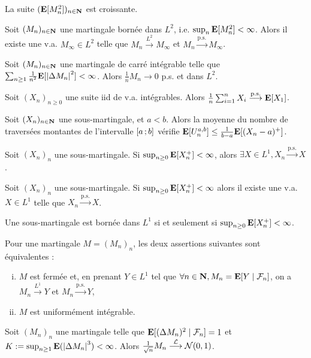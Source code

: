 \begin{rem}
	La suite $(\mathbf{E}[M_n^2])_{n \in \mathbf{N}}$ est croissante.
\end{rem}

\begin{thm}
	Soit $(M_n)_{n \in \mathbf{N}}$ une martingale bornée dans $L^2$, i.e. $\sup_n \mathbf{E}[M_n^2] < \infty$.
	Alors il existe une v.a. $M_\infty \in L^2$ telle que $M_n \overset{L^2}{\longrightarrow} M_\infty$ et $M_n \overset{\text{p.s.}}{\longrightarrow} M_\infty$.
\end{thm}

\begin{thm}
	Soit $(M_n)_{n \in \mathbf{N}}$ une martingale de carré intégrable telle que $\sum_{n \geq 1} \frac{1}{n^2} \mathbf{E}[\left\lvert\Delta M_n\right\rvert^2] < \infty$.
	Alors $\frac{1}{n} M_n \longrightarrow 0$ p.s. et dans $L^2$.
\end{thm}

\begin{thm}
	Soit $(X_n)_{n \geq 0}$ une suite iid de v.a. intégrables.
	Alors $\frac{1}{n} \sum_{i = 1}^n X_i \overset{\text{p.s.}}{\longrightarrow} \mathbf{E}[X_1]$.
\end{thm}

\begin{lem}
	Soit $(X_n)_{n \in \mathbf{N}}$ une sous-martingale, et $a < b$.
	Alors la moyenne du nombre de traversées montantes de l'intervalle $\mathopen{}\mathclose{\left[a\mathclose{}\mathpunct{};b\right]}$ vérifie $\mathbf{E}[U_n^{a,b}] \leq \frac{1}{b - a} \mathbf{E}[(X_n - a)^+]$.
\end{lem}

\begin{thm}
	Soit $(X_n)_n$ une sous-martingale.
	Si $\sup_{n \geq 0} \mathbf{E}[X_n^+] < \infty$, alors $\exists X \in L^1, X_n \overset{\text{p.s.}}{\longrightarrow}X$.
\end{thm}

\begin{thm}
	Soit $(X_n)_n$ une sous-martingale.
	Si $\sup_{n \geq 0} \mathbf{E}[X_n^+] < \infty$ alors il existe une v.a. $X \in L^1$ telle que $X_n \overset{\text{p.s.}}{\longrightarrow} X$.
\end{thm}

\begin{rem}
	Une sous-martingale est bornée dans $L^1$ si et seulement si $\sup_{n \geq 0} \mathbf{E}[X_n^+] < \infty$.
\end{rem}

\begin{thm}
	Pour une martingale $M = (M_n)_n$, les deux assertions suivantes sont équivalentes :
	\begin{enumerate}[(i)]
		\item $M$ est fermée et, en prenant $Y \in L^1$ tel que $\forall n \in \mathbf{N}, M_n = \mathbf{E}[Y \mid \mathcal{F}_n]$, on a $M_n \overset{L^1}{\longrightarrow} Y$ et $M_n \overset{\text{p.s.}}{\longrightarrow} Y$,
		\item $M$ est uniformément intégrable.
	\end{enumerate}
\end{thm}

\begin{thm}
	Soit $(M_n)_n$ une martingale telle que $\mathbf{E}[(\Delta M_n)^2 \mid \mathcal{F}_n] = 1$ et $K := \sup_{n \geq 1} \mathbf{E}(\left\lvert\Delta M_n\right\rvert^3) < \infty$.
	Alors $\frac{1}{\sqrt{n}} M_n \overset{\mathcal{L}}{\longrightarrow} \mathcal{N}(0,1)$.
\end{thm}
